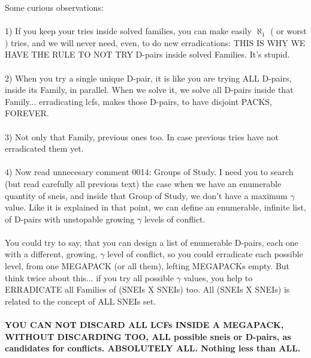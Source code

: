 			\noindent
			Some curious observations:\\\\
			1) If you keep your tries inside solved families, you can make easily $\aleph_{1}$ ( or worst ) tries, and we will never need, even, to do new erradications: THIS IS WHY WE HAVE THE RULE TO NOT TRY D-pairs inside solved Families. It's stupid.\\\\
			2) When you try a single unique D-pair, it is like you are trying ALL D-pairs, inside its Family, in parallel. When we solve it, we solve all D-pairs inside that Family... erradicating lcfs, makes those D-pairs, to have disjoint PACKS, FOREVER.\\\\
			3) Not only that Family, previous ones too. In case previous tries have not erradicated them yet.\\\\
			4) Now read unnecesary comment 0014: Groups of Study. I need you to search (but read carefully all previous text) the case when we have an enumerable quantity of sneis, and inside that Group of Study, we don't have a maximum $\gamma$ value. Like it is explained in that point, we can define an enumerable, infinite list, of D-pairs with unstopable growing $\gamma$ levels of conflict.\\\\
			You could try to say, that you can design a list of enumerable D-pairs, each one with a different, growing, $\gamma$ level of conflict, so you could erradicate each possible level, from one MEGAPACK (or all them), lefting MEGAPACKs empty. But think twice about this... if you try all possible $\gamma$ values, you help to ERRADICATE all Families of (SNEIs X SNEIs) too. All (SNEIs X SNEIs) is related to the concept of ALL SNEIs set.\\\\
			\textbf{YOU CAN NOT DISCARD ALL LCFs INSIDE A MEGAPACK, WITHOUT DISCARDING TOO, ALL possible sneis or D-pairs, as candidates for conflicts. ABSOLUTELY ALL. Nothing less than ALL.}
			\\\\
		
		
		
		
		